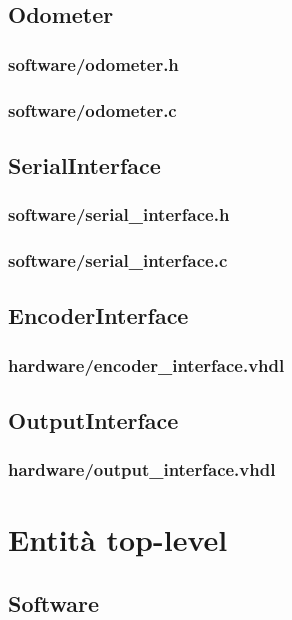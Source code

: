 \documentclass [11pt,a4paper,oneside]{paper}
\newcommand{\inputVHDL}[1]{}
\newcommand{\inputC}[1]{}
\begin{document}
\subsection{Odometer}
\subsubsection{software/odometer.h}
\inputC{software/odometer.h}
\subsubsection{software/odometer.c}
\inputC{software/odometer.c}

\subsection{SerialInterface}
\subsubsection{software/serial\_interface.h}
\inputC{software/serial_interface.h}
\subsubsection{software/serial\_interface.c}
\inputC{software/serial_interface.c}

\subsection{EncoderInterface}
\subsubsection{hardware/encoder\_interface.vhdl}
\inputVHDL{hardware/encoder_interface.vhdl}

\subsection{OutputInterface}
\subsubsection{hardware/output\_interface.vhdl}
\inputVHDL{hardware/output_interface.vhdl}


\section{Entità top-level}
\subsection{Software}
\inputC{software/software.c}
\end{document}

